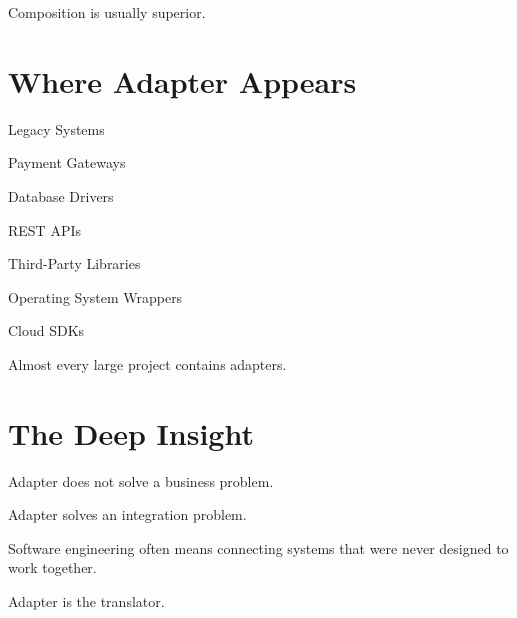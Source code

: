 \documentclass[11pt,a4paper]{book}
\begin{document}
Composition is usually superior.


\section{Where Adapter Appears}

Legacy Systems


Payment Gateways


Database Drivers


REST APIs


Third-Party Libraries


Operating System Wrappers


Cloud SDKs


Almost every large project
contains adapters.


\section{The Deep Insight}

Adapter does not solve a
business problem.


Adapter solves an
integration problem.


\begin{idea}

Software engineering often
means connecting systems
that were never designed
to work together.


Adapter is the translator.

\end{idea}
\end{document}
